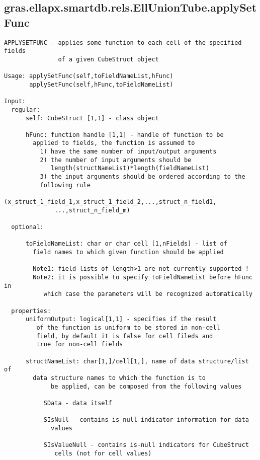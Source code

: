 \subsection{\texorpdfstring{gras.ellapx.smartdb.rels.EllUnionTube.applySetFunc}{applySetFunc}}\label{method:gras.ellapx.smartdb.rels.EllUnionTube.applySetFunc}
\begin{verbatim}
APPLYSETFUNC - applies some function to each cell of the specified fields
               of a given CubeStruct object

Usage: applySetFunc(self,toFieldNameList,hFunc)
       applySetFunc(self,hFunc,toFieldNameList)

Input:
  regular:
      self: CubeStruct [1,1] - class object

      hFunc: function handle [1,1] - handle of function to be
        applied to fields, the function is assumed to
          1) have the same number of input/output arguments
          2) the number of input arguments should be
             length(structNameList)*length(fieldNameList)
          3) the input arguments should be ordered according to the
          following rule
              (x_struct_1_field_1,x_struct_1_field_2,...,struct_n_field1,
              ...,struct_n_field_m)

  optional:

      toFieldNameList: char or char cell [1,nFields] - list of
        field names to which given function should be applied

        Note1: field lists of length>1 are not currently supported !
        Note2: it is possible to specify toFieldNameList before hFunc in
           which case the parameters will be recognized automatically

  properties:
      uniformOutput: logical[1,1] - specifies if the result
         of the function is uniform to be stored in non-cell
         field, by default it is false for cell fileds and
         true for non-cell fields

      structNameList: char[1,]/cell[1,], name of data structure/list of
        data structure names to which the function is to
             be applied, can be composed from the following values

           SData - data itself

           SIsNull - contains is-null indicator information for data
             values

           SIsValueNull - contains is-null indicators for CubeStruct
              cells (not for cell values)


\end{verbatim}
